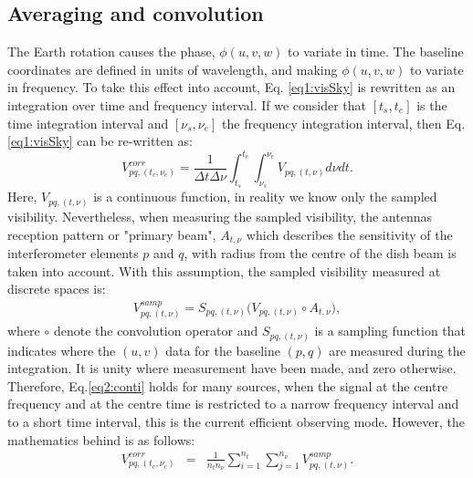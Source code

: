 \documentclass[useAMS,usenatbib]{mn2e}
\begin{document}
\subsection{Averaging and convolution}
\label{sec:AvgCon}
The Earth rotation causes the phase, $\phi (u,v,w)$ to variate in time. The baseline 
coordinates are defined in units of wavelength, and making $\phi (u,v,w)$ to variate in frequency. 
To take this effect into account, Eq. \ref{eq1:visSky} is  rewritten as an integration over time and frequency interval. If we 
consider that $[t_s,t_e]$ is the time integration interval and $[\nu_s,\nu_e]$ the frequency integration 
interval, then Eq.\ref{eq1:visSky} can be re-written as:
\begin{equation}
V_{pq,(t_c,\nu_c)}^{corr}=\frac{1}{\Delta t \Delta \nu} \int_{t_s}^{t_e}\int_{\nu_s}^{\nu_e}V_{pq,(t,\nu)}d\nu dt.
\label{eq2:conti}
\end{equation}
Here, $V_{pq,(t,\nu)}$ is a continuous function, in reality we know only the sampled visibility. Nevertheless, when measuring 
the sampled visibility, the antennas reception pattern or "primary beam", $A_{t,\nu}$ which describes the sensitivity of the interferometer
elements $p$ and $q$, with radius from the centre of the dish beam is taken into account. With this assumption, the  sampled visibility  
measured at discrete spaces is:
\begin{eqnarray}
  V_{pq,(t,\nu)}^{samp}=S_{pq,(t,\nu)}\bigg(V_{pq,(t,\nu)}\circ A_{t,\nu}\bigg),
\end{eqnarray}
where $\circ$ denote the convolution operator and $S_{pq,(t,\nu)}$ is a sampling 
function that indicates where the $(u, v)$ data for the baseline $(p,q)$ are measured  during the integration. It is 
unity where measurement have been made, and zero otherwise.
Therefore, 
Eq.\ref{eq2:conti} holds for many sources, when the signal at the centre frequency and at the centre time is restricted to a narrow 
frequency interval and to a short time interval, this is the current efficient observing mode. However, the mathematics behind is as 
follows: 
\begin{eqnarray}
V_{pq,(t_c,\nu_c)}^{corr}&=&\frac{1}{n_t n_{\nu}}  \sum_{i=1}^{n_t}\sum_{j=1}^{n_{\nu}}V_{pq,(t,\nu)}^{samp}.\label{eq2:sample}
\end{eqnarray}
\end{document}
